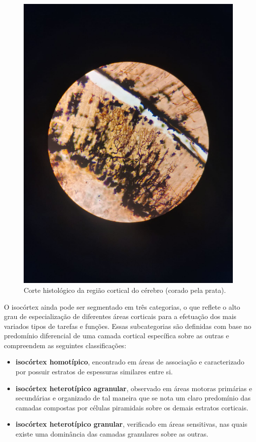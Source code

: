 \documentclass[
]{book}
\providecommand{\tightlist}{%
  \setlength{\itemsep}{0pt}\setlength{\parskip}{0pt}}
\begin{document}
\begin{figure}
\centering
\includegraphics{images/neuro-cortex.jpeg}
\caption{\label{fig:unnamed-chunk-4}Corte histológico da região cortical do cérebro (corado pela prata).}
\end{figure}

O isocórtex ainda pode ser segmentado em três categorias, o que reflete o alto grau de especialização de diferentes áreas corticais para a efetuação dos mais variados tipos de tarefas e funções. Essas subcategorias são definidas com base no predomínio diferencial de uma camada cortical específica sobre as outras e compreendem as seguintes classificações:

\begin{itemize}
\tightlist
\item
  \textbf{isocórtex homotípico}, encontrado em áreas de associação e caracterizado por possuir estratos de espessuras similares entre si.
\item
  \textbf{isocórtex heterotípico agranular}, observado em áreas motoras primárias e secundárias e organizado de tal maneira que se nota um claro predomínio das camadas compostas por células piramidais sobre os demais estratos corticais.
\item
  \textbf{isocórtex heterotípico granular}, verificado em áreas sensitivas, nas quais existe uma dominância das camadas granulares sobre as outras.
\end{itemize}
\end{document}

